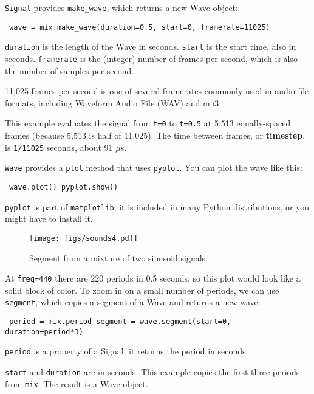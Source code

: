 \documentclass[12pt]{book} \usepackage[width=5.5in,height=8.5in, hmarginratio=3:2,vmarginratio=1:1]{geometry}
\begin{document}
{\tt Signal} provides \verb"make_wave", which returns a new Wave object: 

\begin{verbatim} wave = mix.make_wave(duration=0.5, start=0, framerate=11025) \end{verbatim} 

{\tt duration} is the length of the Wave in seconds. {\tt start} is the start time, also in seconds. {\tt framerate} is the (integer) number of frames per second, which is also the number of samples per second. 

11,025 frames per second is one of several framerates commonly used in audio file formats, including Waveform Audio File (WAV) and mp3. 

This example evaluates the signal from {\tt t=0} to {\tt t=0.5} at 5,513 equally-spaced frames (because 5,513 is half of 11,025). The time between frames, or {\bf timestep}, is {\tt 1/11025} seconds, about 91 $\mu$s. 

{\tt Wave} provides a {\tt plot} method that uses {\tt pyplot}. You can plot the wave like this: 

\begin{verbatim} wave.plot() pyplot.show() \end{verbatim} 

{\tt pyplot} is part of {\tt matplotlib}; it is included in many Python distributions, or you might have to install it. 

\begin{figure} 

\centerline{\texttt{[image: figs/sounds4.pdf]}} \caption{Segment from a mixture of two sinusoid signals.} \label{fig.sounds4} \end{figure} 

At {\tt freq=440} there are 220 periods in 0.5 seconds, so this plot would look like a solid block of color. To zoom in on a small number of periods, we can use {\tt segment}, which copies a segment of a Wave and returns a new wave: 

\begin{verbatim} period = mix.period segment = wave.segment(start=0, duration=period*3) \end{verbatim} 

{\tt period} is a property of a Signal; it returns the period in seconds. 

{\tt start} and {\tt duration} are in seconds. This example copies the first three periods from {\tt mix}. The result is a Wave object. 
\end{document}
